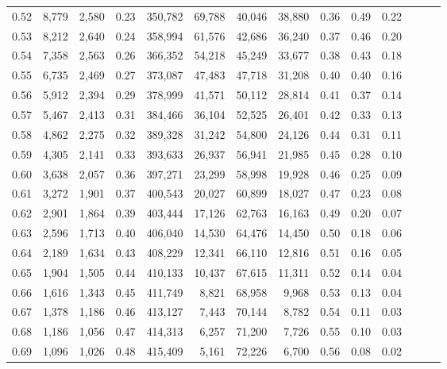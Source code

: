 \begin{tabular}{rrrrrrrrrrrrrr}
0.52 &   8,779 &  2,580 &  0.23 &  350,782 &   69,788 &  40,046 &  38,880 &  0.36 &  0.49 &      0.22 \\
0.53 &   8,212 &  2,640 &  0.24 &  358,994 &   61,576 &  42,686 &  36,240 &  0.37 &  0.46 &      0.20 \\
0.54 &   7,358 &  2,563 &  0.26 &  366,352 &   54,218 &  45,249 &  33,677 &  0.38 &  0.43 &      0.18 \\
0.55 &   6,735 &  2,469 &  0.27 &  373,087 &   47,483 &  47,718 &  31,208 &  0.40 &  0.40 &      0.16 \\
0.56 &   5,912 &  2,394 &  0.29 &  378,999 &   41,571 &  50,112 &  28,814 &  0.41 &  0.37 &      0.14 \\
0.57 &   5,467 &  2,413 &  0.31 &  384,466 &   36,104 &  52,525 &  26,401 &  0.42 &  0.33 &      0.13 \\
0.58 &   4,862 &  2,275 &  0.32 &  389,328 &   31,242 &  54,800 &  24,126 &  0.44 &  0.31 &      0.11 \\
0.59 &   4,305 &  2,141 &  0.33 &  393,633 &   26,937 &  56,941 &  21,985 &  0.45 &  0.28 &      0.10 \\
0.60 &   3,638 &  2,057 &  0.36 &  397,271 &   23,299 &  58,998 &  19,928 &  0.46 &  0.25 &      0.09 \\
0.61 &   3,272 &  1,901 &  0.37 &  400,543 &   20,027 &  60,899 &  18,027 &  0.47 &  0.23 &      0.08 \\
0.62 &   2,901 &  1,864 &  0.39 &  403,444 &   17,126 &  62,763 &  16,163 &  0.49 &  0.20 &      0.07 \\
0.63 &   2,596 &  1,713 &  0.40 &  406,040 &   14,530 &  64,476 &  14,450 &  0.50 &  0.18 &      0.06 \\
0.64 &   2,189 &  1,634 &  0.43 &  408,229 &   12,341 &  66,110 &  12,816 &  0.51 &  0.16 &      0.05 \\
0.65 &   1,904 &  1,505 &  0.44 &  410,133 &   10,437 &  67,615 &  11,311 &  0.52 &  0.14 &      0.04 \\
0.66 &   1,616 &  1,343 &  0.45 &  411,749 &    8,821 &  68,958 &   9,968 &  0.53 &  0.13 &      0.04 \\
0.67 &   1,378 &  1,186 &  0.46 &  413,127 &    7,443 &  70,144 &   8,782 &  0.54 &  0.11 &      0.03 \\
0.68 &   1,186 &  1,056 &  0.47 &  414,313 &    6,257 &  71,200 &   7,726 &  0.55 &  0.10 &      0.03 \\
0.69 &   1,096 &  1,026 &  0.48 &  415,409 &    5,161 &  72,226 &   6,700 &  0.56 &  0.08 &      0.02 \\

\end{tabular}
